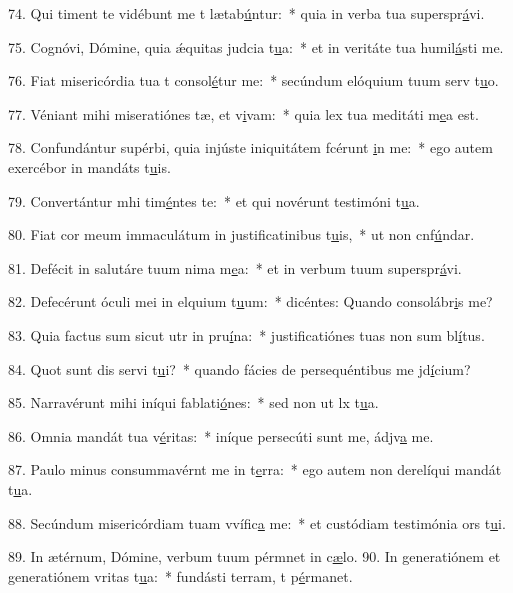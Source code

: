 74. Qui timent te vidébunt me t lætab\uline{ú}ntur:~* quia in verba tua superspr\uline{á}vi.\par 
75. Cognóvi, Dómine, quia ǽquitas judcia t\uline{u}a:~* et in veritáte tua humil\uline{á}sti me.\par 
76. Fiat misericórdia tua t consol\uline{é}tur me:~* secúndum elóquium tuum serv t\uline{u}o.\par 
77. Véniant mihi miseratiónes tæ, et v\uline{i}vam:~* quia lex tua meditáti m\uline{e}a est.\par 
78. Confundántur supérbi, quia injúste iniquitátem fcérunt \uline{i}n me:~* ego autem exercébor in mandáts t\uline{u}is.\par 
79. Convertántur mhi tim\uline{é}ntes te:~* et qui novérunt testimóni t\uline{u}a.\par 
80. Fiat cor meum immaculátum in justificatinibus t\uline{u}is,~* ut non cnf\uline{ú}ndar.\par 
81. Defécit in salutáre tuum nima m\uline{e}a:~* et in verbum tuum superspr\uline{á}vi.\par 
82. Defecérunt óculi mei in elquium t\uline{u}um:~* dicéntes: Quando consolábr\uline{i}s me?\par 
83. Quia factus sum sicut utr in pru\uline{í}na:~* justificatiónes tuas non sum bl\uline{í}tus.\par 
84. Quot sunt dis servi t\uline{u}i?~* quando fácies de persequéntibus me jd\uline{í}cium?\par 
85. Narravérunt mihi iníqui fablati\uline{ó}nes:~* sed non ut lx t\uline{u}a.\par 
86. Omnia mandát tua v\uline{é}ritas:~* iníque persecúti sunt me, ádjv\uline{a} me.\par 
87. Paulo minus consummavérnt me in t\uline{e}rra:~* ego autem non derelíqui mandát t\uline{u}a.\par 
88. Secúndum misericórdiam tuam vvífic\uline{a} me:~* et custódiam testimónia ors t\uline{u}i.\par 
89. In ætérnum, Dómine, verbum tuum pérmnet in c\uline{æ}lo.
90. In generatiónem et generatiónem vritas t\uline{u}a:~* fundásti terram, t p\uline{é}rmanet.\par 
